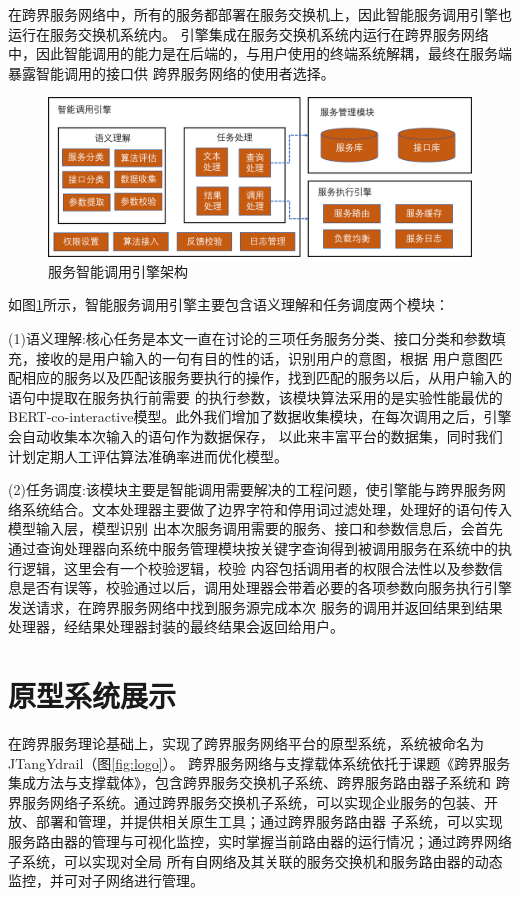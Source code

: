 在跨界服务网络中，所有的服务都部署在服务交换机上，因此智能服务调用引擎也运行在服务交换机系统内。
引擎集成在服务交换机系统内运行在跨界服务网络中，因此智能调用的能力是在后端的，与用户使用的终端系统解耦，最终在服务端暴露智能调用的接口供
跨界服务网络的使用者选择。

\begin{figure}[htbp]
  \centering
  \includegraphics[width=15cm]{./images/yinqing.png}
  \caption{服务智能调用引擎架构}
  \label{fig:yinqing}
\end{figure}

如图\ref{fig:yinqing}所示，智能服务调用引擎主要包含语义理解和任务调度两个模块：

(1)语义理解:核心任务是本文一直在讨论的三项任务服务分类、接口分类和参数填充，接收的是用户输入的一句有目的性的话，识别用户的意图，根据
用户意图匹配相应的服务以及匹配该服务要执行的操作，找到匹配的服务以后，从用户输入的语句中提取在服务执行前需要
的执行参数，该模块算法采用的是实验性能最优的BERT-co-interactive模型。此外我们增加了数据收集模块，在每次调用之后，引擎会自动收集本次输入的语句作为数据保存，
以此来丰富平台的数据集，同时我们计划定期人工评估算法准确率进而优化模型。

(2)任务调度:该模块主要是智能调用需要解决的工程问题，使引擎能与跨界服务网络系统结合。文本处理器主要做了边界字符和停用词过滤处理，处理好的语句传入模型输入层，模型识别
出本次服务调用需要的服务、接口和参数信息后，会首先通过查询处理器向系统中服务管理模块按关键字查询得到被调用服务在系统中的执行逻辑，这里会有一个校验逻辑，校验
内容包括调用者的权限合法性以及参数信息是否有误等，校验通过以后，调用处理器会带着必要的各项参数向服务执行引擎发送请求，在跨界服务网络中找到服务源完成本次
服务的调用并返回结果到结果处理器，经结果处理器封装的最终结果会返回给用户。

\section{原型系统展示}
在跨界服务理论基础上，实现了跨界服务网络平台的原型系统，系统被命名为JTangYdrail（图\ref{fig:logo}）。
跨界服务网络与支撑载体系统依托于课题《跨界服务集成方法与支撑载体》，包含跨界服务交换机子系统、跨界服务路由器子系统和
跨界服务网络子系统。通过跨界服务交换机子系统，可以实现企业服务的包装、开放、部署和管理，并提供相关原生工具；通过跨界服务路由器
子系统，可以实现服务路由器的管理与可视化监控，实时掌握当前路由器的运行情况；通过跨界网络子系统，可以实现对全局
所有自网络及其关联的服务交换机和服务路由器的动态监控，并可对子网络进行管理。

